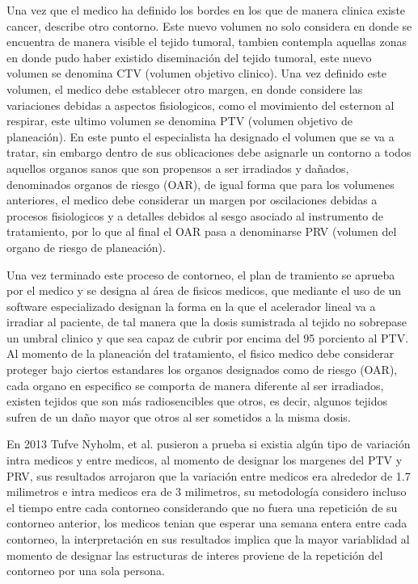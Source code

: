 \documentclass{article}
\begin{document}
\vspace{10pt}


Una vez que el medico ha definido los bordes en los que de manera clinica existe cancer, describe otro contorno. Este nuevo volumen no solo considera en donde se encuentra de manera visible el tejido tumoral, tambien contempla aquellas zonas en donde pudo haber existido diseminación del tejido tumoral, este nuevo volumen se denomina CTV (volumen objetivo clinico). Una vez definido este volumen, el medico debe establecer otro margen, en donde considere las variaciones debidas a aspectos fisiologicos, como el movimiento del esternon al respirar, este ultimo volumen se denomina  PTV (volumen objetivo de planeación). En este punto el especialista ha designado el volumen que se va a tratar, sin embargo dentro de sus oblicaciones debe asignarle un contorno a todos aquellos organos sanos que son propensos a ser irradiados y dañados, denominados organos de riesgo (OAR), de igual forma que para los volumenes anteriores, el medico debe considerar un margen por oscilaciones debidas a procesos fisiologicos y a detalles debidos al sesgo asociado al instrumento de tratamiento, por lo que al final el OAR pasa a denominarse PRV (volumen del organo de riesgo de planeación). 


\vspace{10pt}


Una vez terminado este proceso de contorneo, el plan de tramiento se aprueba por el medico y se designa al área de fisicos medicos, que mediante el uso de un software especializado designan la forma en la que el acelerador lineal va a irradiar al paciente, de tal manera que la dosis sumistrada al tejido no sobrepase un umbral clinico y que sea capaz de cubrir por encima del 95 porciento al PTV. Al momento de la planeación del tratamiento, el fisico medico debe considerar proteger bajo ciertos estandares los organos designados como de riesgo (OAR), cada organo en especifico se comporta de manera diferente al ser irradiados, existen tejidos que son más radiosencibles que otros, es decir, algunos tejidos sufren de un daño mayor que otros al ser sometidos a la misma dosis.

\vspace{10pt}


En 2013 Tufve Nyholm, et al. pusieron a prueba si existia algún tipo de variación intra medicos y entre medicos, al momento de designar los margenes del PTV y PRV, sus resultados arrojaron que la variación entre medicos era alrededor de 1.7 milimetros e intra medicos era de 3 milimetros, su metodología considero incluso el tiempo entre cada contorneo considerando que no fuera una repetición de su contorneo anterior, los medicos tenian que esperar una semana entera entre cada contorneo, la interpretación en sus resultados implica que la mayor variablidad al momento de designar las estructuras de interes proviene de la repetición del contorneo por una sola persona. 
\end{document}
